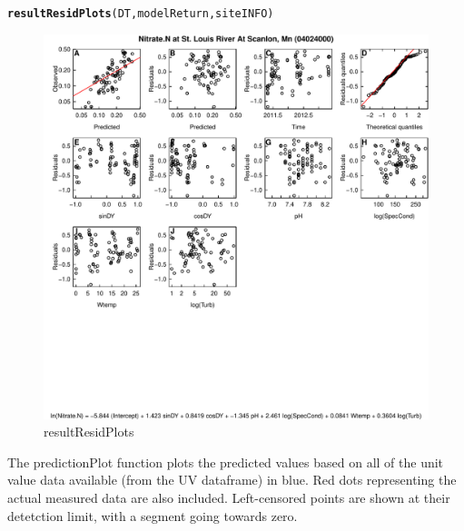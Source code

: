 \documentclass[a4paper,11pt]{article}\usepackage[]{graphicx}\usepackage[]{color}
\makeatletter
\def\maxwidth{ %
  \ifdim\Gin@nat@width>\linewidth
    \linewidth
  \else
    \Gin@nat@width
  \fi
}
\newcommand{\hlstd}[1]{\textcolor[rgb]{0.345,0.345,0.345}{#1}}%
\newcommand{\hlkwd}[1]{\textcolor[rgb]{0.737,0.353,0.396}{\textbf{#1}}}%
\newenvironment{kframe}{%
 \def\at@end@of@kframe{}%
 \ifinner\ifhmode%
  \def\at@end@of@kframe{\end{minipage}}%
  \begin{minipage}{\columnwidth}%
 \fi\fi%
 \def\FrameCommand##1{\hskip\@totalleftmargin \hskip-\fboxsep
 \colorbox{shadecolor}{##1}\hskip-\fboxsep
     \hskip-\linewidth \hskip-\@totalleftmargin \hskip\columnwidth}%
 \MakeFramed {\advance\hsize-\width
   \@totalleftmargin\z@ \linewidth\hsize
   \@setminipage}}%
 {\par\unskip\endMakeFramed%
 \at@end@of@kframe}
\newenvironment{knitrout}{}{} %
\makeatother
\begin{document}
\begin{knitrout}
\color{fgcolor}\begin{kframe}
\begin{alltt}
\hlkwd{resultResidPlots}\hlstd{(DT,modelReturn,siteINFO)}
\end{alltt}
\end{kframe}\begin{figure}[]

\includegraphics[width=\maxwidth]{figure/resultResidPlots} \caption[resultResidPlots]{resultResidPlots\label{fig:resultResidPlots}}
\end{figure}


\end{knitrout}

\FloatBarrier

The predictionPlot function plots the predicted values based on all of the unit value data available (from the UV dataframe) in blue. Red dots representing the actual measured data are also included. Left-censored points are shown at their detetction limit, with a segment going towards zero.
\end{document}
